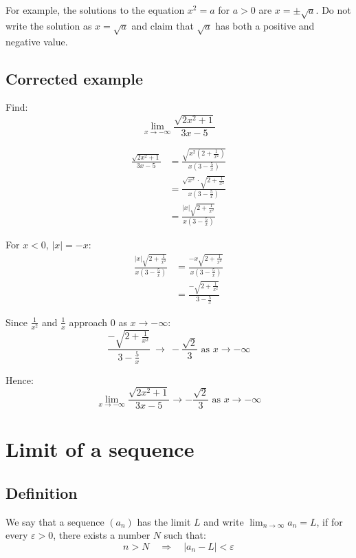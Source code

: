 \documentclass[11pt]{article}
\begin{document}
For example, the solutions to the equation \(x^2 = a\) for \(a > 0\) are \(x = \pm \sqrt{a}\). Do not write the solution as \(x = \sqrt{a}\) and claim that \(\sqrt{a}\) has both a positive and negative value.

\subsection{Corrected example}
\label{sec:org6b1fec9}
Find:
\[\lim_{x \rightarrow - \infty} \frac{\sqrt{2x^2 + 1}}{3x - 5}\]

\begin{align*}
\frac{\sqrt{2x^2 + 1}}{3x - 5} &=
\frac{\sqrt{x^2 \left(2 + \frac{1}{x^2}\right)}}{x \left(3 - \frac{5}{x} \right)} \\
&= \frac{\sqrt{x^2} \cdot \sqrt{2 + \frac{1}{x^2}}}{x \left(3 - \frac{5}{x} \right)} \\
&= \frac{|x| \sqrt{2 + \frac{1}{x^2}}}{x \left(3 - \frac{5}{x} \right)}
\end{align*}

For \(x < 0\), \(|x| = -x\):
\begin{align*}
\frac{|x| \sqrt{2 + \frac{1}{x^2}}}{x \left(3 - \frac{5}{x} \right)} &=
\frac{-x \sqrt{2 + \frac{1}{x^2}}}{x \left(3 - \frac{5}{x} \right)} \\
&= \frac{- \sqrt{2 + \frac{1}{x^2}}}{3 - \frac{5}{x}}
\end{align*}

Since \(\frac{1}{x^2}\) and \(\frac{1}{x}\) approach 0 as \(x \rightarrow -\infty\):
\[\frac{- \sqrt{2 + \frac{1}{x^2}}}{3 - \frac{5}{x}} \ \rightarrow \ -\frac{\sqrt{2}}{3} \text{ as } x \rightarrow -\infty\]

Hence:
\[\lim_{x \rightarrow - \infty} \frac{\sqrt{2x^2 + 1}}{3x - 5} \rightarrow -\frac{\sqrt{2}}{3} \text{ as } x \rightarrow -\infty\]


\section{Limit of a sequence}
\label{sec:orgcc4af72}

\subsection{Definition}
\label{sec:org218c9df}
We say that a sequence \((a_n)\) has the limit \(L\) and write \(\lim_{n \rightarrow \infty} a_n = L\), if for every \(\varepsilon > 0\), there exists a number \(N\) such that:
\[n > N \quad \Rightarrow \quad |a_n - L| < \varepsilon\]
\end{document}
